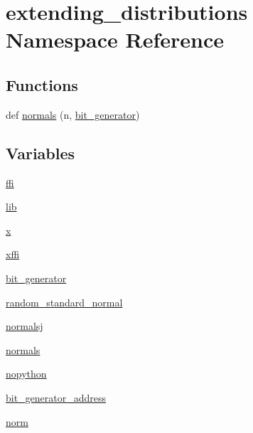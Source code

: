 \hypertarget{namespaceextending__distributions}{}\section{extending\+\_\+distributions Namespace Reference}
\label{namespaceextending__distributions}
\subsection*{Functions}
\begin{DoxyCompactItemize}
\item 
def \hyperlink{namespaceextending__distributions_a8cd6f6a6f39a44acdbfe824e35fb88fb}{normals} (n, \hyperlink{namespaceextending__distributions_a7aeefe715cc042aa2c49c5046ca387e2}{bit\+\_\+generator})
\end{DoxyCompactItemize}
\subsection*{Variables}
\begin{DoxyCompactItemize}
\item 
\hyperlink{namespaceextending__distributions_a0bd63c106a8c7b1a9447728da1168838}{ffi}
\item 
\hyperlink{namespaceextending__distributions_a30f3390d3a1428643dc1120bc9db764c}{lib}
\item 
\hyperlink{namespaceextending__distributions_ac15eda22ab1fccb8a7d1bbf1ce96f925}{x}
\item 
\hyperlink{namespaceextending__distributions_af1688954c460d7d5c2e0009f7d65e619}{xffi}
\item 
\hyperlink{namespaceextending__distributions_a7aeefe715cc042aa2c49c5046ca387e2}{bit\+\_\+generator}
\item 
\hyperlink{namespaceextending__distributions_a455cadea4d1fdf5354ecb9d5de0546e1}{random\+\_\+standard\+\_\+normal}
\item 
\hyperlink{namespaceextending__distributions_a4279c0495c5644bbd23fb3bb28195b61}{normalsj}
\item 
\hyperlink{namespaceextending__distributions_a2354488752e5c9d937201b9ee8d4bde4}{normals}
\item 
\hyperlink{namespaceextending__distributions_a7888cf41ad9dd3d4bee2f128f2976a07}{nopython}
\item 
\hyperlink{namespaceextending__distributions_a534e7ac133b4b284777a1c1965a5eea0}{bit\+\_\+generator\+\_\+address}
\item 
\hyperlink{namespaceextending__distributions_a976ea6c6e452e3b2820868d1aabb3829}{norm}
\end{DoxyCompactItemize}


